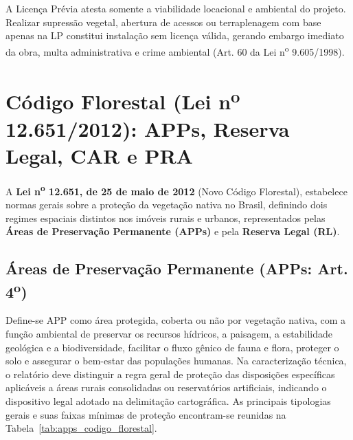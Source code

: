 \begin{boxErro}
A Licença Prévia atesta somente a viabilidade locacional e ambiental do projeto. Realizar supressão vegetal, abertura de acessos ou terraplenagem com base apenas na LP constitui instalação sem licença válida, gerando embargo imediato da obra, multa administrativa e crime ambiental (Art. 60 da Lei n\textsuperscript{o} 9.605/1998).
\end{boxErro}

\section{Código Florestal (Lei n\textsuperscript{o} 12.651/2012): APPs, Reserva Legal, CAR e PRA}

A \textbf{Lei n\textsuperscript{o} 12.651, de 25 de maio de 2012} (Novo Código Florestal), estabelece normas gerais sobre a proteção da vegetação nativa no Brasil, definindo dois regimes espaciais distintos nos imóveis rurais e urbanos, representados pelas \textbf{Áreas de Preservação Permanente (APPs)} e pela \textbf{Reserva Legal (RL)}.

\subsection{Áreas de Preservação Permanente (APPs: Art. 4\textsuperscript{o})}

Define-se APP como área protegida, coberta ou não por vegetação nativa, com a função ambiental de preservar os recursos hídricos, a paisagem, a estabilidade geológica e a biodiversidade, facilitar o fluxo gênico de fauna e flora, proteger o solo e assegurar o bem-estar das populações humanas. Na caracterização técnica, o relatório deve distinguir a regra geral de proteção das disposições específicas aplicáveis a áreas rurais consolidadas ou reservatórios artificiais, indicando o dispositivo legal adotado na delimitação cartográfica. As principais tipologias gerais e suas faixas mínimas de proteção encontram-se reunidas na Tabela~\ref{tab:apps_codigo_florestal}.

